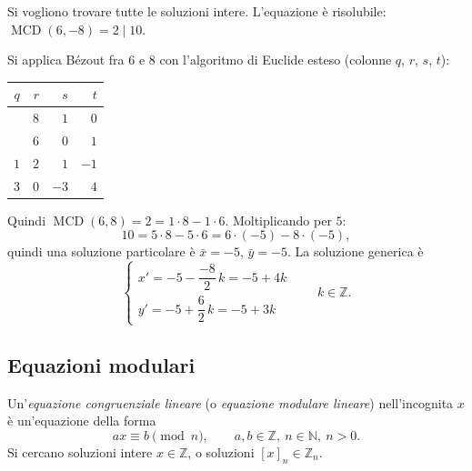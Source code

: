 \documentclass[11pt,a4paper]{article}
\begin{document}
\begin{esempio}[$6x - 8y = 10$]
Si vogliono trovare tutte le soluzioni intere. L'equazione è risolubile: $\operatorname{MCD}(6, -8) = 2 \mid 10$.

Si applica Bézout fra $6$ e $8$ con l'algoritmo di Euclide esteso (colonne $q$, $r$, $s$, $t$):
\begin{center}
\begin{tabular}{c|r|r|r}
$q$ & $r$ & $s$ & $t$ \\
\midrule
 & $8$ & $1$ & $0$ \\
 & $6$ & $0$ & $1$ \\
$1$ & $2$ & $1$ & $-1$ \\
$3$ & $0$ & $-3$ & $4$ \\
\end{tabular}
\end{center}
Quindi $\operatorname{MCD}(6, 8) = 2 = 1\cdot 8 - 1\cdot 6$. Moltiplicando per $5$:
\[
  10 = 5\cdot 8 - 5\cdot 6 = 6\cdot(-5) - 8\cdot(-5),
\]
quindi una soluzione particolare è $\bar{x} = -5$, $\bar{y} = -5$. La soluzione generica è
\[
  \begin{cases} x' = -5 - \dfrac{-8}{2}\,k = -5 + 4k \\[2mm] y' = -5 + \dfrac{6}{2}\,k = -5 + 3k \end{cases} \qquad k \in \mathbb{Z}.
\]
\end{esempio}

\subsection{Equazioni modulari}

\begin{definizione}
Un'\emph{equazione congruenziale lineare} (o \emph{equazione modulare lineare}) nell'incognita $x$ è un'equazione della forma
\[
  ax \equiv b \pmod n, \qquad a, b \in \mathbb{Z},\ n \in \mathbb{N},\ n > 0.
\]
Si cercano soluzioni intere $x \in \mathbb{Z}$, o soluzioni $[x]_n \in \mathbb{Z}_n$.
\end{definizione}
\end{document}
